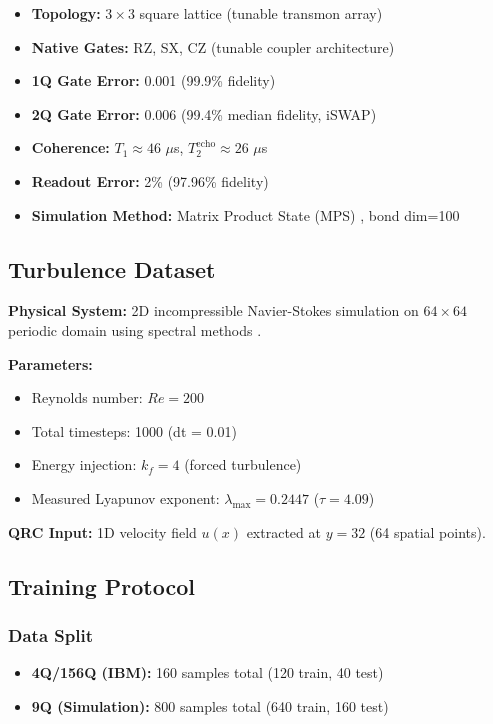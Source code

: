 \documentclass[conference]{IEEEtran}
\begin{document}
\begin{itemize}
    \item \textbf{Topology:} $3 \times 3$ square lattice (tunable transmon array)
    \item \textbf{Native Gates:} RZ, SX, CZ (tunable coupler architecture)
    \item \textbf{1Q Gate Error:} 0.001 (99.9\% fidelity)
    \item \textbf{2Q Gate Error:} 0.006 (99.4\% median fidelity, iSWAP)
    \item \textbf{Coherence:} $T_1 \approx 46$ $\mu$s, $T_2^{\text{echo}} \approx 26$ $\mu$s
    \item \textbf{Readout Error:} 2\% (97.96\% fidelity)
    \item \textbf{Simulation Method:} Matrix Product State (MPS) \cite{vidal2003efficient, orus2014practical}, bond dim=100
\end{itemize}


\subsection{Turbulence Dataset}

\textbf{Physical System:} 2D incompressible Navier-Stokes simulation on $64 \times 64$ periodic domain using spectral methods \cite{pope2000turbulent, kraichnan1967inertial, boffetta2012two}.

\textbf{Parameters:}
\begin{itemize}
    \item Reynolds number: $Re = 200$
    \item Total timesteps: 1000 (dt = 0.01)
    \item Energy injection: $k_f = 4$ (forced turbulence)
    \item Measured Lyapunov exponent: $\lambda_{\max} = 0.2447$ ($\tau = 4.09$)
\end{itemize}

\textbf{QRC Input:} 1D velocity field $u(x)$ extracted at $y=32$ (64 spatial points).

\subsection{Training Protocol}

\subsubsection{Data Split}
\begin{itemize}
    \item \textbf{4Q/156Q (IBM):} 160 samples total (120 train, 40 test)
    \item \textbf{9Q (Simulation):} 800 samples total (640 train, 160 test)
\end{itemize}
\end{document}

